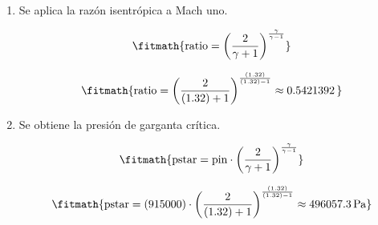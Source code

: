\begin{enumerate}

\item Se aplica la razón isentrópica a Mach uno.

\[\fitmath{\mathrm{ratio}={\left(\frac{2}{\gamma+1}\right)}^{\frac{\gamma}{\gamma-1}}}\]

\[\fitmath{\mathrm{ratio}={\left(\frac{2}{(1.32)+1}\right)}^{\frac{(1.32)}{(1.32)-1}}\approx 0.5421392\,}\]

\item Se obtiene la presión de garganta crítica.

\[\fitmath{\mathrm{pstar}=\mathrm{pin}\cdot {\left(\frac{2}{\gamma+1}\right)}^{\frac{\gamma}{\gamma-1}}}\]

\[\fitmath{\mathrm{pstar}=(915000)\cdot {\left(\frac{2}{(1.32)+1}\right)}^{\frac{(1.32)}{(1.32)-1}}\approx 496057.3\,\mathrm{Pa}}\]

\end{enumerate}

